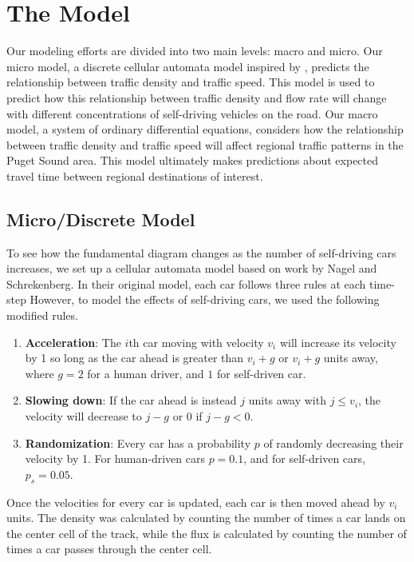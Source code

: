 \section{The Model} \label{sec:the_model}

Our modeling efforts are divided into two main levels: macro and micro. Our micro model, a discrete cellular automata model inspired by \cite{Nagel1992ATraffic}, predicts the relationship between traffic density and traffic speed. This model is used to predict how this relationship between traffic density and flow rate will change with different concentrations of self-driving vehicles on the road. Our macro model, a system of ordinary differential equations, considers how the relationship between traffic density and traffic speed will affect regional traffic patterns in the Puget Sound area. This model ultimately makes predictions about expected travel time between regional destinations of interest.

\subsection{Micro/Discrete Model}

To see how the fundamental diagram changes as the number of self-driving cars increases, we set up a cellular automata model based on work by Nagel and Schrekenberg. In their original model, each car follows three rules at each time-step However, to model the effects of self-driving cars, we used the following modified rules.
\begin{enumerate}
	\item \textbf{Acceleration}: The $i$th car moving with velocity $v_i$ will increase its velocity by 1 so long as the car ahead is greater than $v_i+g$ or $v_i+g$ units away, where $g=2$ for a human driver, and $1$ for self-driven car.
    \item \textbf{Slowing down}: If the car ahead is instead $j$ units away with $j\leq v_i$, the velocity will decrease to $j-g$ or 0 if $j-g<0$.
    \item \textbf{Randomization}: Every car has a probability $p$ of randomly decreasing their velocity by 1. For human-driven cars $p=0.1$, and for self-driven cars, $p_s=0.05$.
\end{enumerate}
Once the velocities for every car is updated, each car is then moved ahead by $v_i$ units. The density was calculated by counting the number of times a car lands on the center cell of the track, while the flux is calculated by counting the number of times a car passes through the center cell.

